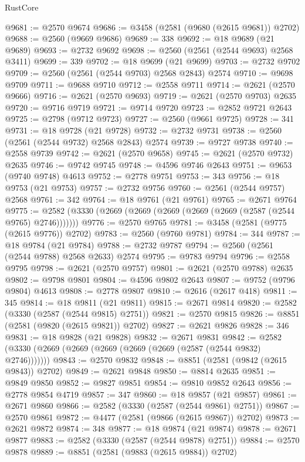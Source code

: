 \begin{lexlean}{RustCore}
\begin{coremodule}
@9681 := @2570 @9674
@9686 := @3458 (@2581 (@9680 (@2615 @9681)) @2702)
@9688 := @2560 (@9669 @9686)
@9689 := 338
@9692 := @18 @9689 (@21 @9689)
@9693 := @2732 @9692
@9698 := @2560 (@2561 (@2544 @9693) @2568 @3411)
@9699 := 339
@9702 := @18 @9699 (@21 @9699)
@9703 := @2732 @9702
@9709 := @2560 (@2561 (@2544 @9703) @2568 @2843) @2574
@9710 := @9698 @9709
@9711 := @9688 @9710
@9712 := @2558 @9711
@9714 := @2621 (@2570 @9666)
@9716 := @2621 (@2570 @9693)
@9719 := @2621 (@2570 @9703) @2635
@9720 := @9716 @9719
@9721 := @9714 @9720
@9723 := @2852 @9721 @2643
@9725 := @2798 (@9712 @9723)
@9727 := @2560 (@9661 @9725)
@9728 := 341
@9731 := @18 @9728 (@21 @9728)
@9732 := @2732 @9731
@9738 := @2560 (@2561 (@2544 @9732) @2568 @2843) @2574
@9739 := @9727 @9738
@9740 := @2558 @9739
@9742 := @2621 (@2570 @9658)
@9745 := @2621 (@2570 @9732) @2635
@9746 := @9742 @9745
@9748 := @4596 @9746 @2643
@9751 := @9653 (@9740 @9748) @4613
@9752 := @2778 @9751
@9753 := 343
@9756 := @18 @9753 (@21 @9753)
@9757 := @2732 @9756
@9760 := @2561 (@2544 @9757) @2568
@9761 := 342
@9764 := @18 @9761 (@21 @9761)
@9765 := @2671 @9764
@9775 := @2582 (@3330 (@2669 (@2669 (@2669 (@2669 (@2669 (@2587 (@2544 @9765) @2746)))))))
@9776 := @2570 @9765
@9781 := @3458 (@2581 (@9775 (@2615 @9776)) @2702)
@9783 := @2560 (@9760 @9781)
@9784 := 344
@9787 := @18 @9784 (@21 @9784)
@9788 := @2732 @9787
@9794 := @2560 (@2561 (@2544 @9788) @2568 @2633) @2574
@9795 := @9783 @9794
@9796 := @2558 @9795
@9798 := @2621 (@2570 @9757)
@9801 := @2621 (@2570 @9788) @2635
@9802 := @9798 @9801
@9804 := @4596 @9802 @2643
@9807 := @9752 (@9796 @9804) @4613
@9808 := @2778 @9807
@9810 := @2616 (@2617 @418)
@9811 := 345
@9814 := @18 @9811 (@21 @9811)
@9815 := @2671 @9814
@9820 := @2582 (@3330 (@2587 (@2544 @9815) @2751))
@9821 := @2570 @9815
@9826 := @8851 (@2581 (@9820 (@2615 @9821)) @2702)
@9827 := @2621 @9826
@9828 := 346
@9831 := @18 @9828 (@21 @9828)
@9832 := @2671 @9831
@9842 := @2582 (@3330 (@2669 (@2669 (@2669 (@2669 (@2669 (@2587 (@2544 @9832) @2746)))))))
@9843 := @2570 @9832
@9848 := @8851 (@2581 (@9842 (@2615 @9843)) @2702)
@9849 := @2621 @9848
@9850 := @8814 @2635
@9851 := @9849 @9850
@9852 := @9827 @9851
@9854 := @9810 @9852 @2643
@9856 := @2778 @9854 @4719
@9857 := 347
@9860 := @18 @9857 (@21 @9857)
@9861 := @2671 @9860
@9866 := @2582 (@3330 (@2587 (@2544 @9861) @2751))
@9867 := @2570 @9861
@9872 := @4477 (@2581 (@9866 (@2615 @9867)) @2702)
@9873 := @2621 @9872
@9874 := 348
@9877 := @18 @9874 (@21 @9874)
@9878 := @2671 @9877
@9883 := @2582 (@3330 (@2587 (@2544 @9878) @2751))
@9884 := @2570 @9878
@9889 := @8851 (@2581 (@9883 (@2615 @9884)) @2702)

\end{coremodule}
\end{lexlean}
